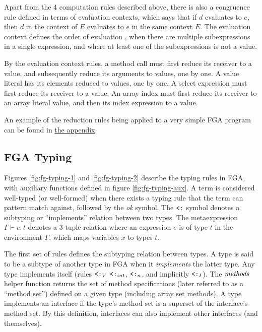 Apart from the 4 computation rules described above, there is also a congruence
rule defined in terms of evaluation contexts, which says that if $d$ evaluates
to $e$, then $d$ in the context of $E$ evaluates to $e$ in the same context $E$.
The evaluation context defines the order of evaluation \autocite{evalContexts},
when there are multiple subexpressions in a single expression, and where at
least one of the subexpressions is not a value.

By the evaluation context rules, a method call must first reduce its receiver to
a value, and subsequently reduce its arguments to values, one by one. A value
literal has its elements reduced to values, one by one. A select expression must
first reduce its receiver to a value. An array index must first reduce its
receiver to an array literal value, and then its index expression to a value.

An example of the reduction rules being applied to a very simple FGA program can
be found in \hyperref[sec:fg-derivation-example]{the appendix}.




\subsection{FGA Typing}

Figures \ref{fig:fg-typing-1} and \ref{fig:fg-typing-2} describe the typing
rules in FGA, with auxiliary functions defined in figure
\ref{fig:fg-typing-aux}. A term is considered well-typed (or well-formed) when
there exists a typing rule that the term can pattern match against, followed by
the \emph{ok} symbol. The $\mathbin{\texttt{<:}}$ symbol denotes a subtyping or ``implements''
relation between two types. The metaexpression $\Gamma \vdash e : t$ denotes a
3-tuple relation where an expression $e$ is of type $t$ in the environment
$\Gamma$, which maps variables $x$ to types $t$.

The first set of rules defines the subtyping relation between types. A type is
said to be a subtype of another type in FGA when it \emph{implements} the latter
type. Any type implements itself (rules $\mathbin{\texttt{<:}}_V$ $\mathbin{\texttt{<:}}_{int}$, $\mathbin{\texttt{<:}}_n$, and
implicitly $\mathbin{\texttt{<:}}_I$). The $\mathit{methods}$ helper function returns the set of method
specifications (later referred to as a ``method set'') defined on a given type
(including array set methods). A type implements an interface if the type's
method set is a superset of the interface's method set. By this definition,
interfaces can also implement other interfaces (and themselves).

